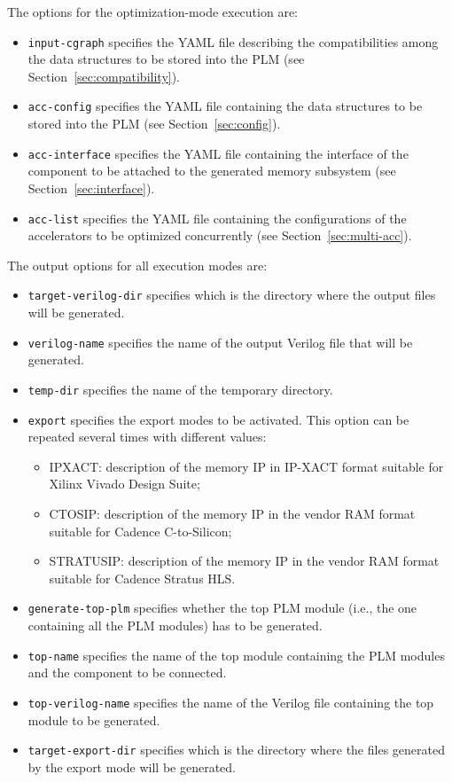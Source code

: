 \noindent The options for the optimization-mode execution are:
\begin{itemize}
\item {\tt input-cgraph} specifies the YAML file describing the compatibilities among the data structures to be stored into the PLM (see Section~\ref{sec:compatibility}).
\item {\tt acc-config} specifies the YAML file containing the data
  structures to be stored into the PLM (see Section~\ref{sec:config}).
\item {\tt acc-interface} specifies the YAML file containing the
  interface of the component to be
  attached to the generated memory subsystem (see
  Section~\ref{sec:interface}).
\item {\tt acc-list} specifies the YAML file containing the
  configurations of the accelerators to be optimized concurrently (see
  Section~\ref{sec:multi-acc}).
\end{itemize}

\noindent The output options for all execution modes are:
\begin{itemize}
\item {\tt target-verilog-dir} specifies which is the directory where the
  output files will be generated.
\item {\tt verilog-name} specifies the name of the output Verilog file that will be generated.
\item {\tt temp-dir} specifies the name of the temporary directory.
\item {\tt export} specifies the export modes to be activated. This option can be repeated several times with different values:
\begin{itemize}
\item IPXACT: description of the memory IP in IP-XACT format suitable for Xilinx Vivado Design Suite;
\item CTOSIP: description of the memory IP in the vendor RAM format suitable for Cadence C-to-Silicon;
\item STRATUSIP: description of the memory IP in the vendor RAM format suitable for Cadence Stratus HLS.
\end{itemize}
\item {\tt generate-top-plm} specifies whether the top PLM module (i.e., the one containing all the PLM modules) has to be generated.
\item {\tt top-name} specifies the name of the top module containing the PLM modules and the component to be connected.
\item {\tt top-verilog-name} specifies the name of the Verilog file containing the top module to be generated.
\item {\tt target-export-dir} specifies which is the directory where the
 files generated by the export mode will be generated.
\end{itemize}
  
